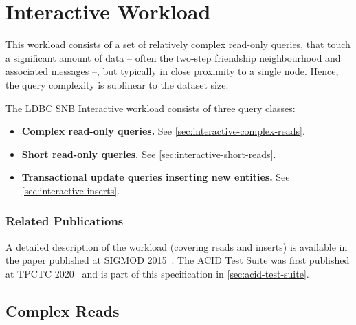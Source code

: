\chapter{Interactive Workload}
\label{sec:interactive}

This workload consists of a set of relatively complex read-only queries, that touch a significant
amount of data -- often the two-step friendship neighbourhood and associated messages --, but typically in close proximity to a single node. Hence, the query complexity is sublinear to the dataset size.

The LDBC SNB Interactive workload consists of three query classes:

\begin{itemize}
\item \textbf{Complex read-only queries.} See \autoref{sec:interactive-complex-reads}.
\item \textbf{Short read-only queries.} See \autoref{sec:interactive-short-reads}.
\item \textbf{Transactional update queries inserting new entities.} See \autoref{sec:interactive-inserts}.
\end{itemize}

\subsection*{Related Publications}

A detailed description of the workload (covering reads and inserts) is available in the paper published at \mbox{SIGMOD} 2015~\cite{DBLP:conf/sigmod/ErlingALCGPPB15}. The ACID Test Suite was first published at TPCTC 2020~\cite{DBLP:conf/tpctc/WaudbySKMBS20} and is part of this specification in \autoref{sec:acid-test-suite}.


\section{Complex Reads}
\label{sec:interactive-complex-reads}




